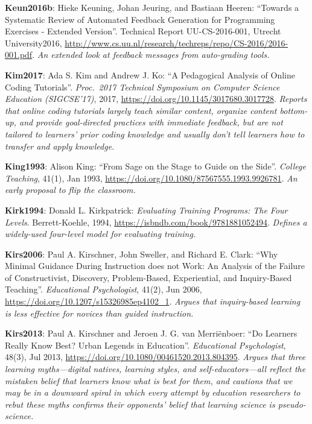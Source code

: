 \textbf{\hypertarget{b:Keun2016b}{Keun2016b}\label{b:Keun2016b}}: Hieke Keuning, Johan Jeuring, and Bastiaan Heeren: ``Towards a Systematic Review of Automated Feedback Generation for Programming Exercises - Extended Version''. Technical Report UU-CS-2016-001, Utrecht University2016, \url{http://www.cs.uu.nl/research/techreps/repo/CS-2016/2016-001.pdf}. \emph{An extended look at feedback messages from auto-grading tools.}

\textbf{\hypertarget{b:Kim2017}{Kim2017}\label{b:Kim2017}}: Ada S. Kim and Andrew J. Ko: ``A Pedagogical Analysis of Online Coding Tutorials''. \emph{Proc.\ 2017 Technical Symposium on Computer Science Education (SIGCSE'17)}, 2017, \url{https://doi.org/10.1145/3017680.3017728}. \emph{Reports that online coding tutorials largely teach similar content, organize content bottom-up, and provide goal-directed practices with immediate feedback, but are not tailored to learners' prior coding knowledge and usually don't tell learners how to transfer and apply knowledge.}

\textbf{\hypertarget{b:King1993}{King1993}\label{b:King1993}}: Alison King: ``From Sage on the Stage to Guide on the Side''. \emph{College Teaching}, 41(1), Jan 1993, \url{https://doi.org/10.1080/87567555.1993.9926781}. \emph{An early proposal to flip the classroom.}

\textbf{\hypertarget{b:Kirk1994}{Kirk1994}\label{b:Kirk1994}}: Donald L. Kirkpatrick: \emph{Evaluating Training Programs: The Four Levels}. Berrett-Koehle, 1994, \url{https://isbndb.com/book/9781881052494}. \emph{Defines a widely-used four-level model for evaluating training.}

\textbf{\hypertarget{b:Kirs2006}{Kirs2006}\label{b:Kirs2006}}: Paul A. Kirschner, John Sweller, and Richard E. Clark: ``Why Minimal Guidance During Instruction does not Work: An Analysis of the Failure of Constructivist, Discovery, Problem-Based, Experiential, and Inquiry-Based Teaching''. \emph{Educational Psychologist}, 41(2), Jun 2006, \url{https://doi.org/10.1207/s15326985ep4102_1}. \emph{Argues that inquiry-based learning is less effective for novices than guided instruction.}

\textbf{\hypertarget{b:Kirs2013}{Kirs2013}\label{b:Kirs2013}}: Paul A. Kirschner and Jeroen J. G. van Merriënboer: ``Do Learners Really Know Best? Urban Legends in Education''. \emph{Educational Psychologist}, 48(3), Jul 2013, \url{https://doi.org/10.1080/00461520.2013.804395}. \emph{Argues that three learning myths---digital natives, learning styles, and self-educators---all reflect the mistaken belief that learners know what is best for them, and cautions that we may be in a downward spiral in which every attempt by education researchers to rebut these myths confirms their opponents' belief that learning science is pseudo-science.}

